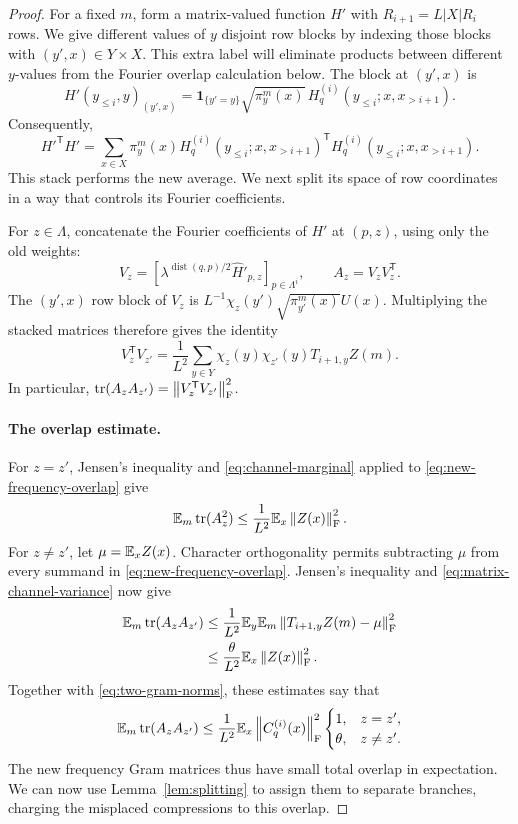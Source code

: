 \begin{proof}
For a fixed $m$, form a matrix-valued function $H'$ with
$R_{i+1}=L|X|R_i$ rows.  We give different values of $y$ disjoint row
blocks by indexing those blocks with $(y',x)\in Y\times X$.
This extra label will eliminate products between different $y$-values
from the Fourier overlap calculation below.
The block at $(y',x)$ is
\begin{equation}\label{eq:tagged-stack}
  H'(y_{\le i},y)_{(y',x)}
  =\mathbf1_{\{y'=y\}}\sqrt{\pi_y^m(x)}\,
       H_q^{(i)}(y_{\le i};x,x_{>i+1}).
\end{equation}
Consequently,
\[
  H'^{\mathsf T}H'
  =\sum_{x\in X}\pi_y^m(x)
       H_q^{(i)}(y_{\le i};x,x_{>i+1})^{\mathsf T}
       H_q^{(i)}(y_{\le i};x,x_{>i+1}).
\]
This stack performs the new average.  We next split its space of row
coordinates in a way that controls its Fourier coefficients.

For $z\in\Lambda$, concatenate the Fourier coefficients of $H'$ at
$(p,z)$, using only the old weights:
\[
  V_z=\left[\lambda^{\operatorname{dist}(q,p)/2}
                 \widehat H'_{p,z}\right]_{p\in\Lambda^i},
  \qquad A_z=V_zV_z^{\mathsf T}.
\]
The $(y',x)$ row block of $V_z$ is
$L^{-1}\chi_z(y')\sqrt{\pi_{y'}^m(x)}U(x)$.
Multiplying the stacked matrices therefore gives the identity
\begin{equation}\label{eq:new-frequency-overlap}
  V_z^{\mathsf T}V_{z'}
  =\frac1{L^2}\sum_{y\in Y}
       \chi_z(y)\chi_{z'}(y)T_{i+1,y}Z(m).
\end{equation}
In particular,
$\operatorname{tr}(A_zA_{z'})=\left\lVert V_z^{\mathsf T}V_{z'}\right\rVert_{\mathrm F}^2$.

\paragraph{The overlap estimate.}
For $z=z'$, Jensen's inequality and
\eqref{eq:channel-marginal} applied to
\eqref{eq:new-frequency-overlap} give
\[
  \mathbb E_m\operatorname{tr}(A_z^2)
  \le\frac1{L^2}\mathbb E_x\left\lVert Z(x)\right\rVert_{\mathrm F}^2.
\]
For $z\ne z'$, let $\mu=\mathbb E_xZ(x)$.
Character orthogonality permits subtracting $\mu$ from every summand
in \eqref{eq:new-frequency-overlap}.  Jensen's inequality and
\eqref{eq:matrix-channel-variance} now give
\[
\begin{split}
  \mathbb E_m\operatorname{tr}(A_zA_{z'})
  &\le\frac1{L^2}\mathbb E_y\mathbb E_m
           \left\lVert T_{i+1,y}Z(m)-\mu\right\rVert_{\mathrm F}^2\\
  &\le\frac\theta{L^2}\mathbb E_x\left\lVert Z(x)\right\rVert_{\mathrm F}^2.
\end{split}
\]
Together with \eqref{eq:two-gram-norms}, these estimates say that
\begin{equation}\label{eq:overlap-summary}
  \mathbb E_m\operatorname{tr}(A_zA_{z'})
  \le \frac1{L^2}\mathbb E_x\left\lVert C_q^{(i)}(x)\right\rVert_{\mathrm F}^2
  \begin{cases}
    1,&z=z',\\
    \theta,&z\ne z'.
  \end{cases}
\end{equation}
The new frequency Gram matrices thus have small total overlap in
expectation.  We can now use Lemma~\ref{lem:splitting} to assign them
to separate branches, charging the misplaced compressions to this
overlap.


\end{proof}
